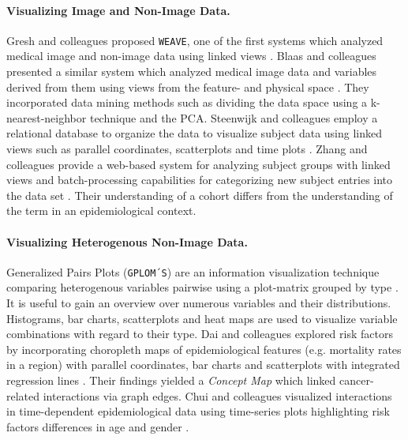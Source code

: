 \documentclass[journal]{style/vgtc} 			          %
\begin{document}
\paragraph{Visualizing Image and Non-Image Data. }
Gresh and colleagues proposed \texttt{WEAVE}, one of the first systems which analyzed medical image and non-image data using linked views \cite{Gresh2000}.
%
Blaas and colleagues presented a similar system which analyzed medical image data and variables derived from them using views from the feature- and physical space \cite{Blaas2007}.
%
They incorporated data mining methods such as dividing the data space using a k-nearest-neighbor technique and the PCA.
%
Steenwijk and colleagues employ a relational database to organize the data to visualize subject data using linked views such as parallel coordinates, scatterplots and time plots \cite{Steenwijk2010}.
%
Zhang and colleagues provide a web-based system for analyzing subject groups with linked views and batch-processing capabilities for categorizing new subject entries into the data set \cite{Zhang2012}.
%
Their understanding of a cohort differs from the understanding of the term in an epidemiological context.

\paragraph{Visualizing Heterogenous Non-Image Data.}
Generalized Pairs Plots (\texttt{GPLOM´S}) are an information visualization technique comparing heterogenous variables pairwise using a plot-matrix grouped by type \cite{Francois2013}.
%
It is useful to gain an overview over numerous variables and their distributions.
%
Histograms, bar charts, scatterplots and heat maps are used to visualize variable combinations with regard to their type.
%
%
%
%
Dai and colleagues explored risk factors by incorporating choropleth maps of epidemiological features (e.g. mortality rates in a region) with parallel coordinates, bar charts and scatterplots with integrated regression lines \cite{Dai2005}.
%
Their findings yielded a \emph{Concept Map} which linked cancer-related interactions via graph edges.
Chui and colleagues visualized interactions in time-dependent epidemiological data using time-series plots highlighting risk factors differences in age and gender \cite{Chui2011}.
\end{document}
